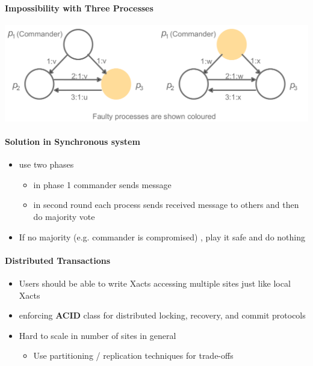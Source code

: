 \paragraph{Impossibility with Three Processes}
\includegraphics[scale=0.15]{graphics/byzantine-impossible.png}


\paragraph{Solution in Synchronous system}
\begin{itemize}
\item use two phases
  \begin{itemize}
  \item in phase 1 commander sends message
  \item in second round each process sends received message to others
    and then do majority vote
  \end{itemize}
\item If no majority (e.g. commander is compromised)
  , play it safe and do nothing
\end{itemize}


\paragraph{Distributed Transactions}
\begin{itemize}
\item Users should be able to write Xacts accessing multiple
  sites just like local Xacts

\item enforcing \textbf{ACID} class for distributed locking,
  recovery, and commit protocols

\item Hard to scale in number of sites in general
  \begin{itemize}
  \item Use partitioning / replication
    techniques for trade-offs
  \end{itemize}
\end{itemize}


